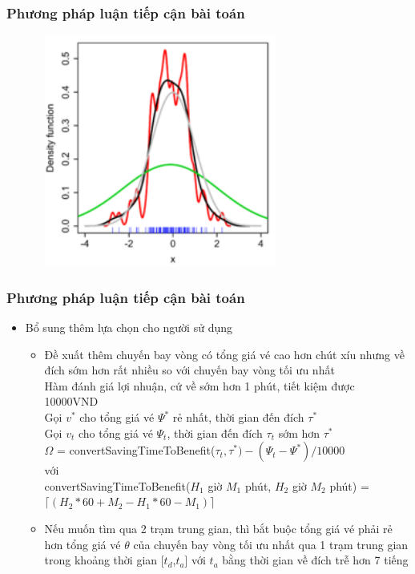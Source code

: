 \documentclass[t]{beamer}
\begin{document}
\begin{frame}
\frametitle{Phương pháp luận tiếp cận bài toán}
\begin{center}
\includegraphics[height=3in,width=4in]{220px-Comparison_of_1D_bandwidth_selectors.png}
\end{center}
\end{frame}

\begin{frame}
\frametitle{Phương pháp luận tiếp cận bài toán}
\begin{itemize}
\item Bổ sung thêm lựa chọn cho người sử dụng
\begin{itemize}
\item Đề xuất thêm chuyến bay vòng có tổng giá vé cao hơn chút xíu nhưng về đích sớm hơn rất nhiều so với chuyến bay vòng tối ưu nhất\\
Hàm đánh giá lợi nhuận, cứ về sớm hơn 1 phút, tiết kiệm được 10000VND\\
Gọi $v^*$ cho tổng giá vé $\Psi^*$ rẻ nhất, thời gian đến đích $\tau^*$\\
Gọi $v_t$ cho tổng giá vé $\Psi_t$, thời gian đến đích $\tau_t$ sớm hơn $\tau^*$\\
$\Omega$ = convertSavingTimeToBenefit($\tau_t, \tau^*) - (\Psi_t - \Psi^*)/10000$\\
với\\
convertSavingTimeToBenefit($H_{1}$ giờ $M_{1}$ phút, $H_{2}$ giờ $M_{2}$ phút) = $\lceil(H_{2}*60+M_{2}-H_{1}*60-M_{1})\rceil$\\
\item Nếu muốn tìm qua 2 trạm trung gian, thì bắt buộc tổng giá vé phải rẻ hơn tổng giá vé $\theta$ của chuyến bay vòng tối ưu nhất qua 1 trạm trung gian 
trong khoảng thời gian [$t_d$,$t_a$] với $t_a$ bằng thời gian về đích trễ hơn 7 tiếng
\end{itemize}
\end{itemize}
\end{frame}
\end{document}
